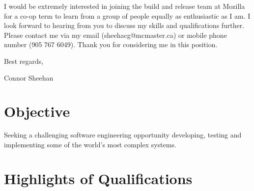 \documentclass[11pt,a4paper,sans]{moderncv}        %
\begin{document}
I would be extremely interested in joining the build and release team at Mozilla for a co-op term to learn from a group of people equally as enthusiastic as I am. I look forward to hearing from you to discuss my skills and qualifications further. Please contact me via my email (sheehacg@mcmaster.ca) or mobile phone number (905 767 6049). Thank you for considering me in this position.


Best regards,

Connor Sheehan

\makeletterclosing

\clearpage

\fi
\makecvtitle

\section{Objective}
\begin{center}
Seeking a challenging software engineering opportunity developing, testing and implementing some of the world's most complex systems.
\end{center}


\hspace{1cm}

\section{Highlights of Qualifications}

\hspace{1cm}
\end{document}
